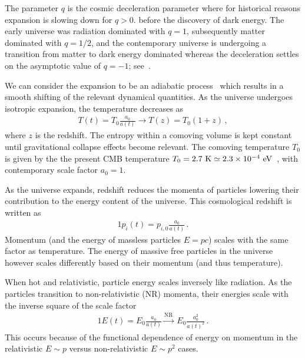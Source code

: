 The parameter $q$ is the cosmic deceleration parameter where for historical reasons expansion is slowing down for $q>0$. before the discovery of dark energy. The early universe was radiation dominated with $q = 1$, subsequently matter dominated with $q = 1/2$, and the contemporary universe is undergoing a transition from matter to dark energy dominated whereas the deceleration settles on the asymptotic value of $q = -1$; see~\cite{Rafelski:2013yka}.

We can consider the expansion to be an adiabatic process~\citep{Abdalla:2022yfr} which results in a smooth shifting of the relevant dynamical quantities. As the universe undergoes isotropic expansion, the temperature decreases as 
\begin{gather}
 \label{tscale}
 T(t)=T_{0}\frac{a_{0}}{a(t)}\rightarrow T(z)=T_{0}(1+z)\,,
\end{gather}
where $z$ is the redshift. The entropy within a comoving volume is kept constant until gravitational collapse effects become relevant. The comoving temperature $T_{0}$ is given by the the present CMB temperature $T_{0}=2.7{\rm\ K}\simeq2.3\times10^{-4}\eV$~\citep{Planck:2018vyg}, with contemporary scale factor $a_{0}=1$.

As the universe expands, redshift reduces the momenta of particles lowering their contribution to the energy content of the universe. This cosmological redshift is written as
\begin{alignat}{1}
  \label{Redshift} p_{i}(t) = p_{i,0}\frac{a_{0}}{a(t)}\,.
\end{alignat}
Momentum (and the energy of massless particles $E=pc$) scales with the same factor as temperature. The energy of massive free particles in the universe however scales differently based on their momentum (and thus temperature).

When hot and relativistic, particle energy scales inversely like radiation. As the particles transition to non-relativistic (NR) momenta, their energies scale with the inverse square of the scale factor
\begin{alignat}{1}
    \label{EScale} E(t) = E_{0}\frac{a_{0}}{a(t)}\xrightarrow{\mathrm{NR}}\  E_{0}\frac{a_{0}^{2}}{a(t)^{2}}\,.
\end{alignat}
This occurs because of the functional dependence of energy on momentum in the relativistic $E\sim p$ versus non-relativistic $E\sim p^{2}$ cases.